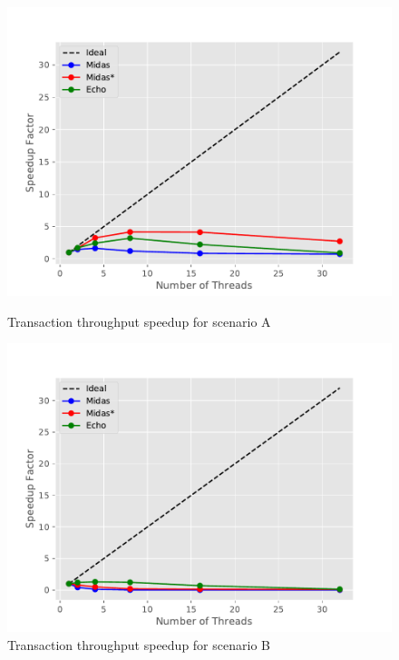 \begin{figure}
\begin{minipage}[l]{0.50\textwidth}
        \includegraphics[width=\textwidth]{figures/bench/spd-ss}
        \caption{Transaction throughput speedup for scenario A}
\end{minipage}
\begin{minipage}[l]{0.50\textwidth}
        \includegraphics[width=\textwidth]{figures/bench/spd-sl}
        \caption{Transaction throughput speedup for scenario B}
\end{minipage}


\end{figure}
